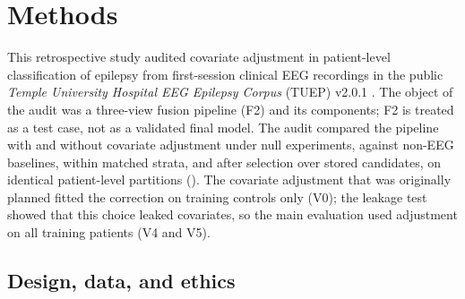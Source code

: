 \section{Methods}\label{sec:methods}

This retrospective study audited covariate adjustment in patient-level classification of epilepsy from first-session clinical EEG recordings in the public \textit{Temple University Hospital EEG Epilepsy Corpus} (TUEP) v2.0.1 \cite{veloso2017,obeid2016}.
The object of the audit was a three-view fusion pipeline (F2) and its components; F2 is treated as a test case, not as a validated final model.
The audit compared the pipeline with and without covariate adjustment under null experiments, against non-EEG baselines, within matched strata, and after selection over stored candidates, on identical patient-level partitions ().
The covariate adjustment that was originally planned fitted the correction on training controls only (V0); the leakage test showed that this choice leaked covariates, so the main evaluation used adjustment on all training patients (V4 and V5).



\subsection{Design, data, and ethics}\label{sec:desain}


